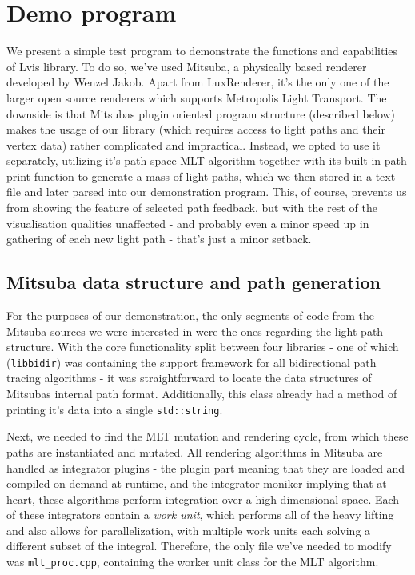 \chapter{Demo program} \label{chap:results}

We present a simple test program to demonstrate the functions and capabilities of Lvis library. To do so, we've used Mitsuba, a physically based renderer developed by Wenzel Jakob. Apart from LuxRenderer, it's the only one of the larger open source renderers which supports Metropolis Light Transport. The downside is that Mitsubas plugin oriented program structure (described below) makes the usage of our library (which requires access to light paths and their vertex data) rather complicated and impractical. Instead, we opted to use it separately, utilizing it's path space MLT algorithm together with its built-in path print function to generate a mass of light paths, which we then stored in a text file and later parsed into our demonstration program. This, of course, prevents us from showing the feature of selected path feedback, but with the rest of the visualisation qualities unaffected - and probably even a minor speed up in gathering of each new light path - that's just a minor setback. 

\section{Mitsuba data structure and path generation}

For the purposes of our demonstration, the only segments of code from the Mitsuba sources we were interested in were the ones regarding the light path structure. With the core functionality split between four libraries - one of which (\texttt{libbidir}) was containing the support framework for all bidirectional path tracing algorithms - it was straightforward to locate the data structures of Mitsubas internal path format. Additionally, this class already had a method of printing it's data into a single \texttt{std::string}.

Next, we needed to find the MLT mutation and rendering cycle, from which these paths are instantiated and mutated. All rendering algorithms in Mitsuba are handled as integrator plugins - the plugin part meaning that they are loaded and compiled on demand at runtime, and the integrator moniker implying that at heart, these algorithms perform integration over a high-dimensional space. Each of these integrators contain a \emph{work unit}, which performs all of the heavy lifting and also allows for parallelization, with multiple work units each solving a different subset of the integral. Therefore, the only file we've needed to modify was \texttt{mlt\_proc.cpp}, containing the worker unit class for the MLT algorithm. 

